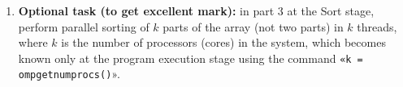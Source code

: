 {\begin{enumerate}
			\begin{itemize}
				\item Use the minimum measurement of ten received ones; 
				\item Calculate the confidence interval with a confidence level of 95\% based on ten dimensions.
			\end{itemize}
			Give graphs of parallel acceleration for both methods in the same coordinate system, furthermore, giving the lower and upper bounds of the confidence interval by two independent graphs is advisable.
		\item\textbf{Optional task (to get excellent mark):} in part 3 at the Sort stage, perform parallel sorting of $k$ parts of the array (not two parts) in $k$ threads, where $k$ is the number of processors (cores) in the system, which becomes known only at the program execution stage using the command \texttt{«k = omp\textunderscore get\textunderscore num\textunderscore procs()}».
	\end{enumerate}
}